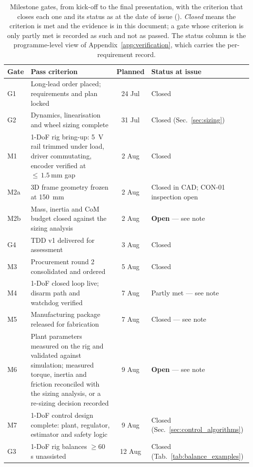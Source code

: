 \begin{table}[htbp]
\centering
\caption[Milestone gates and their status at issue]{Milestone gates, from
kick-off to the final presentation, with the criterion that closes each one and
its status as at the date of issue (\docdate). \emph{Closed} means the criterion
is met and the evidence is in this document; a gate whose criterion is only
partly met is recorded as such and not as passed. The status column is the
programme-level view of Appendix~\ref{app:verification}, which carries the
per-requirement record.}
\label{tab:gates}
\small
\setlength{\tabcolsep}{4pt}
\begin{tabular}{@{}l L{6.3cm} c L{3.6cm}@{}}
\toprule
\textbf{Gate} & \textbf{Pass criterion} & \textbf{Planned} & \textbf{Status at issue} \\
\midrule
G1 & Long-lead order placed; requirements and plan locked & 24 Jul & Closed \\
G2 & Dynamics, linearisation and wheel sizing complete & 31 Jul & Closed (Sec.~\ref{sec:sizing}) \\
M1 & 1-DoF rig bring-up: \qty{5}{\volt} rail trimmed under load, driver commutating, encoder verified at ${\le}\,\qty{1.5}{\milli\metre}$ gap & 2 Aug & Closed \\
M2a & 3D frame geometry frozen at \qty{150}{\milli\metre} & 2 Aug & Closed in CAD; CON-01 inspection open \\
M2b & Mass, inertia and CoM budget closed against the sizing analysis & 2 Aug & \textbf{Open} --- see note \\
G4 & TDD v1 delivered for assessment & 3 Aug & Closed \\
M3 & Procurement round 2 consolidated and ordered & 5 Aug & Closed \\
M4 & 1-DoF closed loop live; disarm path and watchdog verified & 7 Aug & Partly met --- see note \\
M5 & Manufacturing package released for fabrication & 7 Aug & Closed --- see note \\
M6 & Plant parameters measured on the rig and validated against simulation; measured torque, inertia and friction reconciled with the sizing analysis, or a re-sizing decision recorded & 9 Aug & \textbf{Open} --- see note \\
M7 & 1-DoF control design complete: plant, regulator, estimator and safety logic & 9 Aug & Closed (Sec.~\ref{sec:control_algorithms}) \\
G3 & 1-DoF rig balances $\geq$60 s unassisted & 12 Aug & Closed (Tab.~\ref{tab:balance_examples}) \\

\end{tabular}
\end{table}
